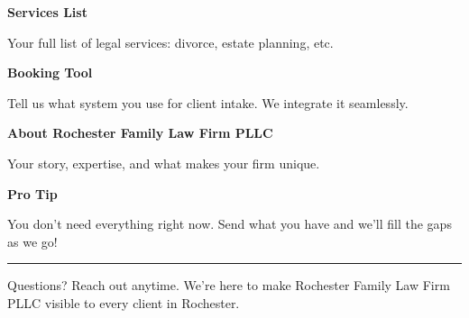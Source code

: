 \documentclass[11pt,letterpaper]{article}
\begin{document}
\begin{minipage}[t]{0.48\textwidth}
\begin{tcolorbox}[colframe=accent-teal, boxrule=1pt, left=0.7em, right=0.7em, top=0.5em, bottom=0.5em, arc=4pt, boxsep=0pt]
{\bfseries\small\color{accent-teal}Services List}

\vspace{0.15em}

{\small Your full list of legal services: divorce, estate planning, etc.}
\end{tcolorbox}

\vspace{0.1em}

\begin{tcolorbox}[colframe=accent-teal, boxrule=1pt, left=0.7em, right=0.7em, top=0.5em, bottom=0.5em, arc=4pt, boxsep=0pt]
{\bfseries\small\color{accent-teal}Booking Tool}

\vspace{0.15em}

{\small Tell us what system you use for client intake. We integrate it seamlessly.}
\end{tcolorbox}

\vspace{0.1em}

\begin{tcolorbox}[colframe=accent-teal, boxrule=1pt, left=0.7em, right=0.7em, top=0.5em, bottom=0.5em, arc=4pt, boxsep=0pt]
{\bfseries\small\color{accent-teal}About Rochester Family Law Firm PLLC}

\vspace{0.15em}

{\small Your story, expertise, and what makes your firm unique.}
\end{tcolorbox}

\vspace{-0.2em}
\end{minipage}

\vspace{0.15em}

\begin{tcolorbox}[colback={accent-red!5}, colframe=accent-red!20, boxrule=0.5pt, left=0.7em, right=0.7em, top=0.4em, bottom=0.4em, arc=6pt, boxsep=0pt]

{\bfseries\small\color{accent-red}Pro Tip}

\vspace{0.1em}

{\small You don't need everything right now. Send what you have and we'll fill the gaps as we go!}

\end{tcolorbox}

\vspace{0.15em}

\noindent\hrule
\vspace{0.2em}

{\small\color{text-light}Questions? Reach out anytime. We're here to make Rochester Family Law Firm PLLC visible to every client in Rochester.}
\end{document}
